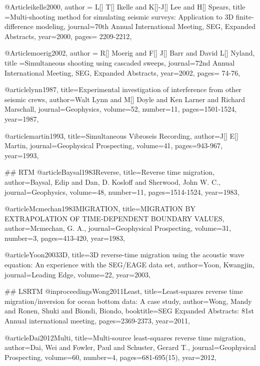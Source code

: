 @Article{ikelle2000,
  author = {L[] T[] Ikelle and K[]-J[] Lee and H[] Spears},
  title ={Multi‐shooting method for simulating seismic surveys: Application to 3{D} finite‐difference modeling},
  journal={70th Annual International Meeting, SEG, Expanded Abstracts},
  year=2000,
  pages={ 2209-2212},
}

@Article{moerig2002,
  author = {R[] Moerig and F[] J[] Barr and David L[] Nyland},
  title ={Simultaneous shooting using cascaded sweeps},
  journal={72nd Annual International Meeting, SEG, Expanded Abstracts},
  year=2002,
  pages={ 74-76},
}





@article{lynn1987,
  title={Experimental investigation of interference from other seismic crews},
  author={Walt Lynn and M[] Doyle and Ken Larner and Richard Marschall},
  journal={Geophysics},
  volume={52},
  number={11},
  pages={1501-1524},
  year={1987},
}


@article{martin1993,
  title={Simultaneous Vibroseis Recording},
  author={J[] E[] Martin},
  journal={Geophysical Prospecting},
  volume={41},
  pages={943-967},
  year={1993},
}


## RTM
@article{Baysal1983Reverse,
  title={Reverse time migration},
  author={Baysal, Edip and Dan, D. Kosloff and Sherwood, John W. C.},
  journal={Geophysics},
  volume={48},
  number={11},
  pages={1514-1524},
  year={1983},
}

@article{Mcmechan1983MIGRATION,
  title={MIGRATION BY EXTRAPOLATION OF TIME‐DEPENDENT BOUNDARY VALUES},
  author={Mcmechan, G. A.},
  journal={Geophysical Prospecting},
  volume={31},
  number={3},
  pages={413-420},
  year={1983},
}

@article{Yoon20033D,
  title={3{D} reverse-time migration using the acoustic wave equation: An experience with the SEG/EAGE data set},
  author={Yoon, Kwangjin},
  journal={Leading Edge},
  volume={22},
  year={2003},
}

## LSRTM
@inproceedings{Wong2011Least,
  title={Least‐squares reverse time migration/inversion for ocean bottom data: A case study},
  author={Wong, Mandy and Ronen, Shuki and Biondi, Biondo},
  booktitle={SEG Expanded Abstracts: 81st Annual international meeting},
  pages={2369-2373},
  year={2011},
}

@article{Dai2012Multi,
  title={Multi-source least-squares reverse time migration},
  author={Dai, Wei and Fowler, Paul and Schuster, Gerard T.},
  journal={Geophysical Prospecting},
  volume={60},
  number={4},
  pages={681-695(15)},
  year={2012},
}

